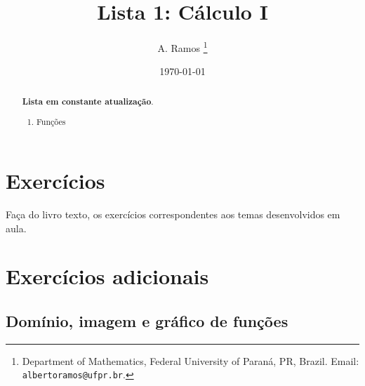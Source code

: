\documentclass[latin,20pt]{article}
\begin{document}
\title{Lista 1: Cálculo I }
 
\author{
A. Ramos \thanks{Department of Mathematics,
    Federal University of Paraná, PR, Brazil.
    Email: {\tt albertoramos@ufpr.br}.}
}

\date{\today}
 
\maketitle

\begin{abstract}
{\bf Lista em constante atualização}.
 \begin{enumerate}
 \item Funções 
 \end{enumerate}
\end{abstract}

 
  \section{Exercícios}   
 
 Faça do livro texto, os exercícios correspondentes aos temas desenvolvidos em aula. 
  
  \section{Exercícios adicionais}  
  \subsection{Domínio, imagem e gráfico de funções}   
  
\end{document}
